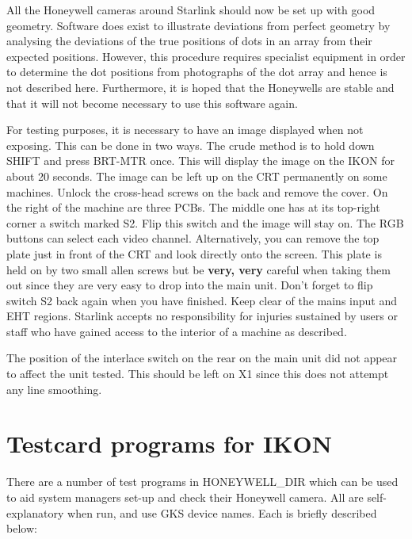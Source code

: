 All the Honeywell cameras around Starlink should now be set up with
good geometry. Software does exist to illustrate deviations from perfect
geometry by analysing the deviations of the true positions of dots in an array
from their expected positions. However, this procedure requires specialist equipment
in order to determine the dot positions from photographs of the dot array
and hence is not described here. Furthermore, it is hoped
that the Honeywells are stable and that it will not become necessary to
use this software again.

For testing purposes, it is necessary to have an image displayed when not
exposing. This can be done in two ways. The crude method
is to hold down SHIFT and press BRT-MTR once. This will display the image on
the IKON for
about 20 seconds. The image can be left up on the CRT permanently on some
machines. Unlock the
cross-head screws on the back and remove the cover. On the right of the machine
are three PCBs. The middle one has at its top-right corner a switch marked S2.
Flip this switch and the image will stay on. The RGB buttons can select each
video channel. Alternatively, you can
remove the top plate just in front of the CRT and look directly onto the screen.
This plate is held on by two small allen screws but be {\bf very, very} careful
when taking them out since they are very easy to drop into the main unit.
Don't forget to flip switch S2 back again when you have finished. Keep clear of
the mains input and EHT regions. Starlink accepts no responsibility for
injuries sustained by users or staff who have gained access to the interior of
a machine as described.

The position of the interlace switch on the rear on the main unit did not
appear to affect the unit tested. This should be left on X1 since this
does not attempt any line smoothing.

\section{Testcard programs for IKON}

There are a number of test programs in HONEYWELL\_DIR which can be used to
aid system managers set-up and check their Honeywell camera. All
are self-explanatory when run, and use GKS device names. Each is briefly
described below:

